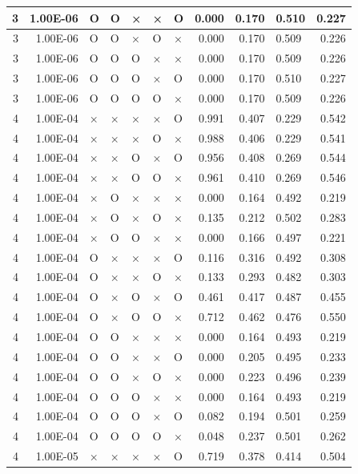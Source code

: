 \documentclass[11pt]{article}
\begin{document}
\begin{longtable}[h]{|r|r|l|l|l|l|l|r|r|l|r|}
3 & 1.00E-06 & O & O & × & × & O & 0.000 & 0.170 & 0.510 & 0.227 \\ \hline
3 & 1.00E-06 & O & O & × & O & × & 0.000 & 0.170 & 0.509 & 0.226 \\ \hline
3 & 1.00E-06 & O & O & O & × & × & 0.000 & 0.170 & 0.509 & 0.226 \\ \hline
3 & 1.00E-06 & O & O & O & × & O & 0.000 & 0.170 & 0.510 & 0.227 \\ \hline
3 & 1.00E-06 & O & O & O & O & × & 0.000 & 0.170 & 0.509 & 0.226 \\ \hline
4 & 1.00E-04 & × & × & × & × & O & 0.991 & 0.407 & 0.229 & 0.542 \\ \hline
4 & 1.00E-04 & × & × & × & O & × & 0.988 & 0.406 & 0.229 & 0.541 \\ \hline
4 & 1.00E-04 & × & × & O & × & O & 0.956 & 0.408 & 0.269 & 0.544 \\ \hline
4 & 1.00E-04 & × & × & O & O & × & 0.961 & 0.410 & 0.269 & 0.546 \\ \hline
4 & 1.00E-04 & × & O & × & × & × & 0.000 & 0.164 & 0.492 & 0.219 \\ \hline
4 & 1.00E-04 & × & O & × & O & × & 0.135 & 0.212 & 0.502 & 0.283 \\ \hline
4 & 1.00E-04 & × & O & O & × & × & 0.000 & 0.166 & 0.497 & 0.221 \\ \hline
4 & 1.00E-04 & O & × & × & × & O & 0.116 & 0.316 & 0.492 & 0.308 \\ \hline
4 & 1.00E-04 & O & × & × & O & × & 0.133 & 0.293 & 0.482 & 0.303 \\ \hline
4 & 1.00E-04 & O & × & O & × & O & 0.461 & 0.417 & 0.487 & 0.455 \\ \hline
4 & 1.00E-04 & O & × & O & O & × & 0.712 & 0.462 & 0.476 & 0.550 \\ \hline
4 & 1.00E-04 & O & O & × & × & × & 0.000 & 0.164 & 0.493 & 0.219 \\ \hline
4 & 1.00E-04 & O & O & × & × & O & 0.000 & 0.205 & 0.495 & 0.233 \\ \hline
4 & 1.00E-04 & O & O & × & O & × & 0.000 & 0.223 & 0.496 & 0.239 \\ \hline
4 & 1.00E-04 & O & O & O & × & × & 0.000 & 0.164 & 0.493 & 0.219 \\ \hline
4 & 1.00E-04 & O & O & O & × & O & 0.082 & 0.194 & 0.501 & 0.259 \\ \hline
4 & 1.00E-04 & O & O & O & O & × & 0.048 & 0.237 & 0.501 & 0.262 \\ \hline
4 & 1.00E-05 & × & × & × & × & O & 0.719 & 0.378 & 0.414 & 0.504 \\ \hline

\end{longtable}
\end{document}
